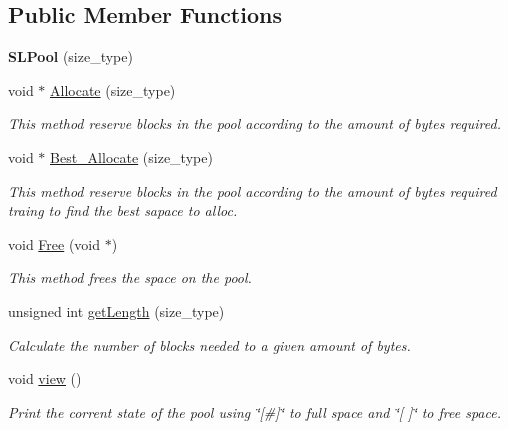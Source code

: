 \subsection*{Public Member Functions}
\begin{DoxyCompactItemize}
\item 
{\bfseries S\+L\+Pool} (size\+\_\+type)\hypertarget{class_s_l_pool_a65f9984edead66802c8af56b0b32b3f8}{}\label{class_s_l_pool_a65f9984edead66802c8af56b0b32b3f8}

\item 
void $\ast$ \hyperlink{class_s_l_pool_a552b1b836f38cd997fb8d2471ed66383}{Allocate} (size\+\_\+type)
\begin{DoxyCompactList}\small\item\em This method reserve blocks in the pool according to the amount of bytes required. \end{DoxyCompactList}\item 
void $\ast$ \hyperlink{class_s_l_pool_a75bc0a6c01a3cd43959d56c339339baf}{Best\+\_\+\+Allocate} (size\+\_\+type)
\begin{DoxyCompactList}\small\item\em This method reserve blocks in the pool according to the amount of bytes required traing to find the best sapace to alloc. \end{DoxyCompactList}\item 
void \hyperlink{class_s_l_pool_aed31c75c4a2d56acd2f845dda2c5b1ad}{Free} (void $\ast$)
\begin{DoxyCompactList}\small\item\em This method frees the space on the pool. \end{DoxyCompactList}\item 
unsigned int \hyperlink{class_s_l_pool_a63cfa56c62750f1dd15a73d5a2ea42c3}{get\+Length} (size\+\_\+type)
\begin{DoxyCompactList}\small\item\em Calculate the number of blocks needed to a given amount of bytes. \end{DoxyCompactList}\item 
void \hyperlink{class_s_l_pool_a9085c8ec923b46f9f72eb1fed7637a6f}{view} ()
\begin{DoxyCompactList}\small\item\em Print the corrent state of the pool using \char`\"{}\mbox{[}\#\mbox{]}\char`\"{} to full space and \char`\"{}\mbox{[} \mbox{]}\char`\"{} to free space. \end{DoxyCompactList}\end{DoxyCompactItemize}


